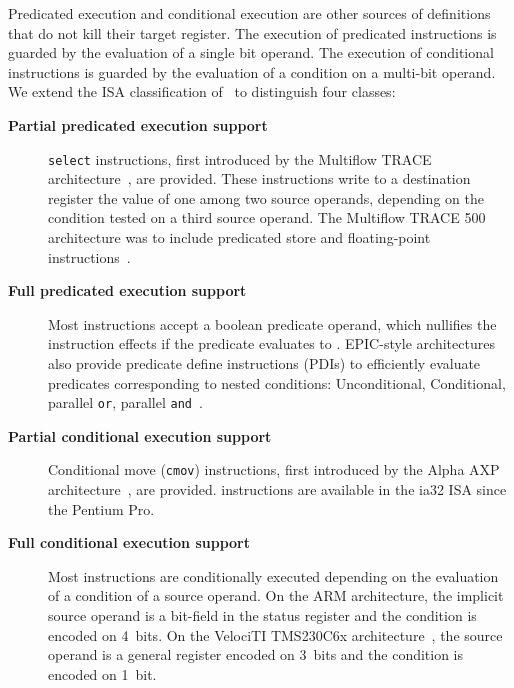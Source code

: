 Predicated execution and conditional execution are other sources of definitions
that do not kill their target register. The execution of predicated instructions
is guarded by the evaluation of a single bit operand. The execution of
conditional instructions is guarded by the evaluation of a condition on a
multi-bit operand. We extend the ISA classification of~\cite{Mahlke:1995:ISCA}
to distinguish four classes: \begin{description}

\item[\textbf{Partial predicated execution support}] \texttt{select} instructions, first
introduced by the Multiflow TRACE architecture~\cite{Colwell:1987:ASPLOS}, are
provided. These instructions write to a destination register the value of one
among two source operands, depending on the condition tested on a third source
operand. The Multiflow TRACE 500 architecture was to include predicated store
and floating-point instructions~\cite{Lowney:1993:JS}.

\item[\textbf{Full predicated execution support}] Most instructions accept a boolean
predicate operand, which nullifies the instruction effects if the predicate
evaluates to \false. EPIC-style architectures also provide predicate define
instructions (PDIs) to efficiently evaluate predicates corresponding to nested
conditions: Unconditional, Conditional, parallel \texttt{or}, parallel \texttt{and}~\cite{Gillies:1996:MICRO}.

\item[\textbf{Partial conditional execution support}] Conditional move (\texttt{cmov})
instructions, first introduced by the Alpha AXP architecture~\cite{Blickstein:1992:DTJ}, are provided.  instructions are available in the
ia32 ISA since the Pentium Pro.

\item[\textbf{Full conditional execution support}] Most instructions are
conditionally executed depending on the evaluation of a condition of a source
operand. On the ARM architecture, the implicit source operand is a bit-field in
the status register and the condition is encoded on 4~bits. On the
VelociTI{\texttrademark} TMS230C6x architecture~\cite{Seshan:1998:IEEESPM}, the
source operand is a general register encoded on 3~bits and the condition is
encoded on 1~bit.

\end{description}


